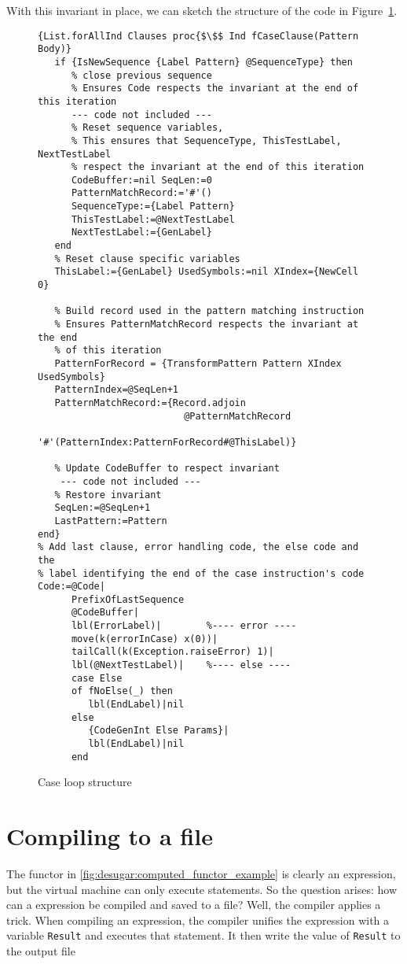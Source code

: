 \documentclass[a4paper]{memoir}
\begin{document}
With this invariant in place, we can sketch the structure of the code 
in Figure~\ref{fig:caseloop}.
\begin{figure}[H]
\begin{lstlisting}[mathescape]
{List.forAllInd Clauses proc{$\$$ Ind fCaseClause(Pattern Body)}
   if {IsNewSequence {Label Pattern} @SequenceType} then
      % close previous sequence
      % Ensures Code respects the invariant at the end of this iteration
      --- code not included ---
      % Reset sequence variables, 
      % This ensures that SequenceType, ThisTestLabel, NextTestLabel 
      % respect the invariant at the end of this iteration
      CodeBuffer:=nil SeqLen:=0
      PatternMatchRecord:='#'()
      SequenceType:={Label Pattern}
      ThisTestLabel:=@NextTestLabel
      NextTestLabel:={GenLabel}
   end
   % Reset clause specific variables 
   ThisLabel:={GenLabel} UsedSymbols:=nil XIndex={NewCell 0}

   % Build record used in the pattern matching instruction
   % Ensures PatternMatchRecord respects the invariant at the end 
   % of this iteration
   PatternForRecord = {TransformPattern Pattern XIndex UsedSymbols}
   PatternIndex=@SeqLen+1
   PatternMatchRecord:={Record.adjoin 
                          @PatternMatchRecord 
                          '#'(PatternIndex:PatternForRecord#@ThisLabel)}

   % Update CodeBuffer to respect invariant
    --- code not included ---
   % Restore invariant
   SeqLen:=@SeqLen+1
   LastPattern:=Pattern
end}
% Add last clause, error handling code, the else code and the 
% label identifying the end of the case instruction's code
Code:=@Code|
      PrefixOfLastSequence
      @CodeBuffer|
      lbl(ErrorLabel)|        %---- error ----
      move(k(errorInCase) x(0))|
      tailCall(k(Exception.raiseError) 1)|
      lbl(@NextTestLabel)|    %---- else ----
      case Else
      of fNoElse(_) then
         lbl(EndLabel)|nil
      else
         {CodeGenInt Else Params}|
         lbl(EndLabel)|nil
      end
\end{lstlisting}
\caption{Case loop structure}
\label{fig:caseloop}
\end{figure}




\section{Compiling to a file}

The functor in \ref{fig:desugar:computed_functor_example} is clearly an
expression, but the virtual machine can only execute statements. So the question
arises: how can a expression be compiled and saved to a file? Well, the compiler 
applies a trick. When compiling an expression, the compiler unifies the
expression with a variable \lstinline!Result! and executes that statement.
It then write the value of \lstinline!Result! to the output file
\end{document}
